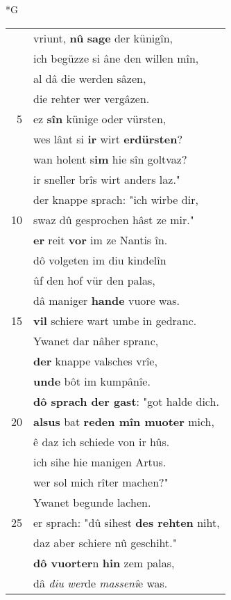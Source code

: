 \documentclass[8pt,a4paper,notitlepage]{article}
\begin{document}
\newpage
\begin{table}[ht]
\begin{minipage}[t]{0.5\linewidth}
\small
\begin{center}*G
\end{center}
\begin{tabular}{rl}
 & vriunt, \textbf{nû} \textbf{sage} der künigîn,\\ 
 & ich begüzze si âne den willen mîn,\\ 
 & al dâ die werden sâzen,\\ 
 & die rehter wer vergâzen.\\ 
5 & ez \textbf{sîn} künige oder vürsten,\\ 
 & wes lânt si \textbf{ir} wirt \textbf{erdürsten}?\\ 
 & wan holent s\textbf{im} hie sîn goltvaz?\\ 
 & ir sneller brîs wirt anders laz."\\ 
 & der knappe sprach: "ich wirbe dir,\\ 
10 & swaz dû gesprochen hâst ze mir."\\ 
 & \textbf{er} reit \textbf{vor} im ze Nantis în.\\ 
 & dô volgeten im diu kindelîn\\ 
 & ûf den hof vür den palas,\\ 
 & dâ maniger \textbf{hande} vuore was.\\ 
15 & \textbf{vil} schiere wart umbe in gedranc.\\ 
 & Ywanet dar nâher spranc,\\ 
 & \textbf{der} knappe valsches vrîe,\\ 
 & \textbf{unde} bôt im kumpânîe.\\ 
 & \textbf{dô sprach der gast}: "got halde dich.\\ 
20 & \textbf{alsus} bat \textbf{reden mîn muoter} mich,\\ 
 & ê daz ich schiede von ir hûs.\\ 
 & ich sihe hie manigen Artus.\\ 
 & wer sol mich rîter machen?"\\ 
 & Ywanet begunde lachen.\\ 
25 & er sprach: "dû sihest \textbf{des rehten} niht,\\ 
 & daz aber schiere nû geschiht."\\ 
 & \textbf{dô vuorter}n \textbf{hin} zem palas,\\ 
 & dâ \textit{diu} \textit{wer}de \textit{massenî}e was.\\ 

\end{tabular}
\end{minipage}
\end{table}
\end{document}
